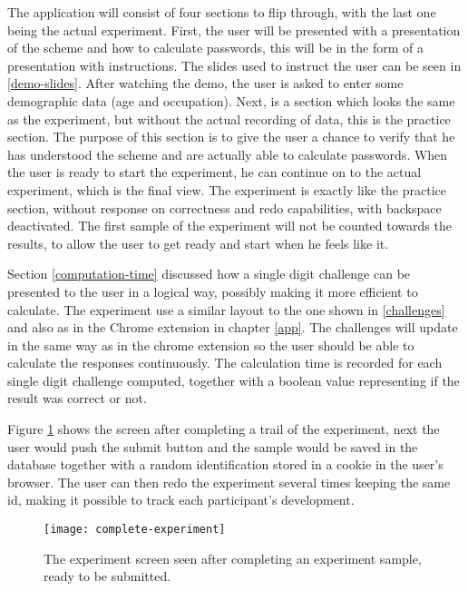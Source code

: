 \par The application will consist of four sections to flip through, with the last one being the actual experiment. First, the user will be presented with a presentation of the scheme and how to calculate passwords, this will be in the form of a presentation with instructions. The slides used to instruct the user can be seen in \autoref{demo-slides}. After watching the demo, the user is asked to enter some demographic data (age and occupation). Next, is a section which looks the same as the experiment, but without the actual recording of data, this is the practice section. The purpose of this section is to give the user a chance to verify that he has understood the scheme and are actually able to calculate passwords. When the user is ready to start the experiment, he can continue on to the actual experiment, which is the final view. The experiment is exactly like the practice section, without response on correctness and redo capabilities, with backspace deactivated. The first sample of the experiment will not be counted towards the results, to allow the user to get ready and start when he feels like it. 


\par Section \ref{computation-time} discussed how a single digit challenge can be presented to the user in a logical way, possibly making it more efficient to calculate. The experiment use a similar layout to the one shown in \autoref{challenges} and also as in the Chrome extension in chapter \ref{app}. The challenges will update in the same way as in the chrome extension so the user should be able to calculate the responses continuously. The calculation time is recorded for each single digit challenge computed, together with a boolean value representing if the result was correct or not. 
\par Figure \ref{complete-experiment} shows the screen after completing a trail of the experiment, next the user would push the submit button and the sample would be saved in the database together with a random identification stored in a cookie in the user's browser. The user can then redo the experiment several times keeping the same id, making it possible to track each participant's development.

\begin{figure}[h]
    \texttt{[image: complete-experiment]}
    \caption{The experiment screen seen after completing an experiment sample, ready to be submitted.}
    \label{complete-experiment}
\end{figure}

